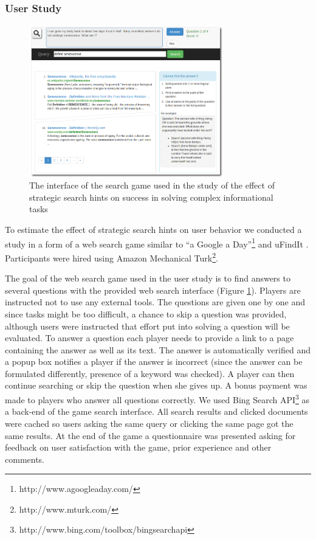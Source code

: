 \subsubsection{User Study}
\label{section:users:hints:userstudy}

\begin{figure}
\centering
\includegraphics[width=0.75\textwidth]{img/hints_ufindit}
\caption{The interface of the search game used in the study of the effect of strategic search hints on success in solving complex informational tasks}
\label{figure:users:hints:ufindit}
\end{figure}

To estimate the effect of strategic search hints on user behavior we conducted a study in a form of a web search game similar to ``a Google a Day''\footnote{http://www.agoogleaday.com/} and uFindIt \cite{Ageev:2011:FYG:2009916.2009965}. Participants were hired using Amazon Mechanical Turk\footnote{http://www.mturk.com/}. 

The goal of the web search game used in the user study is to find answers to several questions with the provided web search interface (Figure \ref{figure:users:hints:ufindit}). 
Players are instructed not to use any external tools.
The questions are given one by one and since tasks might be too difficult, a chance to skip a question was provided, although users were instructed that effort put into solving a question will be evaluated.
To answer a question each player needs to provide a link to a page containing the answer as well as its text.
The answer is automatically verified and a popup box notifies a player if the answer is incorrect (since the answer can be formulated differently, presence of a keyword was checked).
A player can then continue searching or skip the question when she gives up.
A bonus payment was made to players who answer all questions correctly.
We used Bing Search API\footnote{http://www.bing.com/toolbox/bingsearchapi} as a back-end of the game search interface.
All search results and clicked documents were cached so users asking the same query or clicking the same page got the same results.
At the end of the game a questionnaire was presented asking for feedback on user satisfaction with the game, prior experience and other comments.

